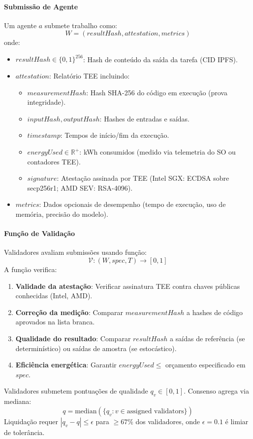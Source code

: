\documentclass[11pt]{article}
\begin{document}
\begin{itemize}[noitemsep]
\begin{itemize}[noitemsep]
\begin{itemize}[noitemsep]
\paragraph{Submissão de Agente} Um agente $a$ submete trabalho como:
\begin{equation}
W = (resultHash, attestation, metrics)
\end{equation}
onde:
\begin{itemize}[noitemsep]
  \item $resultHash \in \{0,1\}^{256}$: Hash de conteúdo da saída da tarefa (CID IPFS).
  \item $attestation$: Relatório TEE incluindo:
    \begin{itemize}[noitemsep]
      \item $measurementHash$: Hash SHA-256 do código em execução (prova integridade).
      \item $inputHash, outputHash$: Hashes de entradas e saídas.
      \item $timestamp$: Tempos de início/fim da execução.
      \item $energyUsed \in \mathbb{R}^+$: kWh consumidos (medido via telemetria do SO ou contadores TEE).
      \item $signature$: Atestação assinada por TEE (Intel SGX: ECDSA sobre secp256r1; AMD SEV: RSA-4096).
    \end{itemize}
  \item $metrics$: Dados opcionais de desempenho (tempo de execução, uso de memória, precisão do modelo).
\end{itemize}

\paragraph{Função de Validação} Validadores avaliam submissões usando função:
\begin{equation}
\mathcal{V}: (W, spec, T) \rightarrow [0, 1]
\end{equation}
A função verifica:
\begin{enumerate}[noitemsep]
  \item \textbf{Validade da atestação}: Verificar assinatura TEE contra chaves públicas conhecidas (Intel, AMD).
  \item \textbf{Correção da medição}: Comparar $measurementHash$ a hashes de código aprovados na lista branca.
  \item \textbf{Qualidade do resultado}: Comparar $resultHash$ a saídas de referência (se determinístico) ou saídas de amostra (se estocástico).
  \item \textbf{Eficiência energética}: Garantir $energyUsed \leq$ orçamento especificado em $spec$.
\end{enumerate}
Validadores submetem pontuações de qualidade $q_v \in [0,1]$. Consenso agrega via mediana:
\begin{equation}
q = \text{median}(\{q_v : v \in \text{assigned validators}\})
\end{equation}
Liquidação requer $|q_v - q| \leq \epsilon$ para $\geq 67\%$ dos validadores, onde $\epsilon = 0.1$ é limiar de tolerância.


\end{itemize}
\end{itemize}
\end{itemize}
\end{document}
